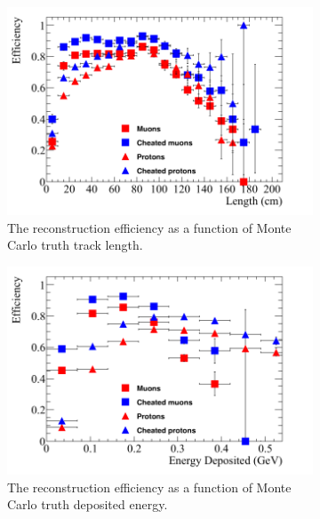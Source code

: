 \begin{figure}[h!]
  \centering
  \begin{subfigure}{0.48\textwidth}
        \centering
        \includegraphics[width=\textwidth]{Effic_SingSamps_Length}
        \caption{The reconstruction efficiency as a function of Monte Carlo truth track length.}
        \label{fig:Isol_Effic_Len}
  \end{subfigure}%
  \hspace{0.03\textwidth}%
  \begin{subfigure}{0.48\textwidth}
        \centering
        \includegraphics[width=\textwidth]{Effic_SingSamps_EnDepos}
        \caption{The reconstruction efficiency as a function of Monte Carlo truth deposited energy.}
        \label{fig:Isol_Effic_EnDepos}
  \end{subfigure}
  \begin{subfigure}{0.48\textwidth}

\end{subfigure}
\end{figure}
